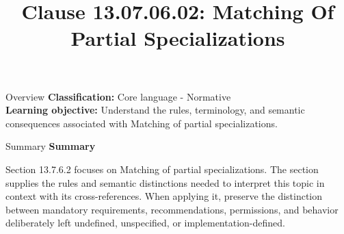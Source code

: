 \documentclass[10pt,letterpaper]{article}
\title{Clause 13.07.06.02: Matching Of Partial Specializations}
\author{}
\date{}
\begin{document}
\maketitle
\begin{CornellOverviewBox}{Overview}
\textbf{Classification:} Core language - Normative\\[2pt]
\textbf{Learning objective:} Understand the rules, terminology, and semantic consequences associated with Matching of partial specializations.
\end{CornellOverviewBox}\begin{CornellSummaryBox}{Summary}
{\sffamily\bfseries\color{Accent} Summary}\par\vspace{3pt}Section 13.7.6.2 focuses on Matching of partial specializations. The section supplies the rules and semantic distinctions needed to interpret this topic in context with its cross-references. When applying it, preserve the distinction between mandatory requirements, recommendations, permissions, and behavior deliberately left undefined, unspecified, or implementation-defined.
\end{CornellSummaryBox}
\end{document}
